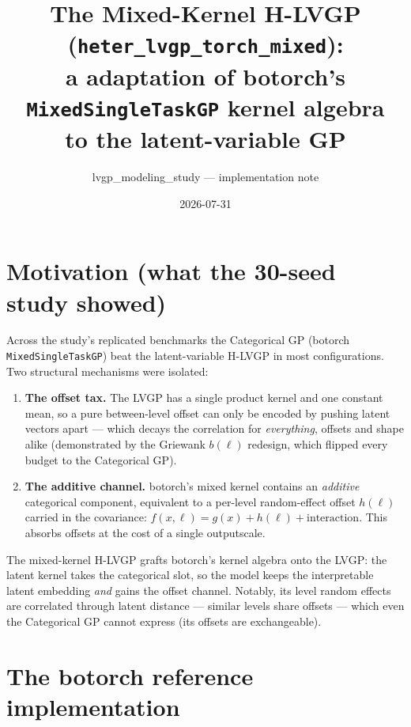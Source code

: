 \documentclass[11pt]{article}
\title{The Mixed-Kernel H-LVGP (\texttt{heter\_lvgp\_torch\_mixed}):\\
a adaptation of botorch's \texttt{MixedSingleTaskGP} kernel algebra\\
to the latent-variable GP}
\author{lvgp\_modeling\_study --- implementation note}
\date{2026-07-31}
\begin{document}
\maketitle

\section{Motivation (what the 30-seed study showed)}

Across the study's replicated benchmarks the Categorical GP (botorch
\texttt{MixedSingleTaskGP}) beat the latent-variable H-LVGP in most configurations. Two
structural mechanisms were isolated:
\begin{enumerate}
\item \textbf{The offset tax.} The LVGP has a single product kernel and one constant mean, so
a pure between-level offset can only be encoded by pushing latent vectors apart --- which
decays the correlation for \emph{everything}, offsets and shape alike (demonstrated by the
Griewank $b(\ell)$ redesign, which flipped every budget to the Categorical GP).
\item \textbf{The additive channel.} botorch's mixed kernel contains an \emph{additive}
categorical component, equivalent to a per-level random-effect offset $h(\ell)$ carried in the
covariance: $f(x,\ell)=g(x)+h(\ell)+\text{interaction}$. This absorbs offsets at the cost of a
single outputscale.
\end{enumerate}
The mixed-kernel H-LVGP grafts botorch's kernel algebra onto the LVGP: the latent kernel takes
the categorical slot, so the model keeps the interpretable latent embedding \emph{and} gains
the offset channel. Notably, its level random effects are correlated through latent distance
--- similar levels share offsets --- which even the Categorical GP cannot express (its offsets
are exchangeable).

\section{The botorch reference implementation}
\end{document}
